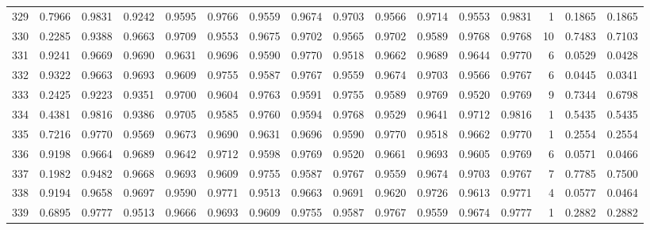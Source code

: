 \begin{tabular}{lrrrrrrrrrrrrrrr}
329 &      0.7966 &  0.9831 &  0.9242 &  0.9595 &  0.9766 &  0.9559 &  0.9674 &  0.9703 &  0.9566 &  0.9714 &   0.9553 &     0.9831 &      1 &                    0.1865 &                     0.1865 \\
330 &      0.2285 &  0.9388 &  0.9663 &  0.9709 &  0.9553 &  0.9675 &  0.9702 &  0.9565 &  0.9702 &  0.9589 &   0.9768 &     0.9768 &     10 &                    0.7483 &                     0.7103 \\
331 &      0.9241 &  0.9669 &  0.9690 &  0.9631 &  0.9696 &  0.9590 &  0.9770 &  0.9518 &  0.9662 &  0.9689 &   0.9644 &     0.9770 &      6 &                    0.0529 &                     0.0428 \\
332 &      0.9322 &  0.9663 &  0.9693 &  0.9609 &  0.9755 &  0.9587 &  0.9767 &  0.9559 &  0.9674 &  0.9703 &   0.9566 &     0.9767 &      6 &                    0.0445 &                     0.0341 \\
333 &      0.2425 &  0.9223 &  0.9351 &  0.9700 &  0.9604 &  0.9763 &  0.9591 &  0.9755 &  0.9589 &  0.9769 &   0.9520 &     0.9769 &      9 &                    0.7344 &                     0.6798 \\
334 &      0.4381 &  0.9816 &  0.9386 &  0.9705 &  0.9585 &  0.9760 &  0.9594 &  0.9768 &  0.9529 &  0.9641 &   0.9712 &     0.9816 &      1 &                    0.5435 &                     0.5435 \\
335 &      0.7216 &  0.9770 &  0.9569 &  0.9673 &  0.9690 &  0.9631 &  0.9696 &  0.9590 &  0.9770 &  0.9518 &   0.9662 &     0.9770 &      1 &                    0.2554 &                     0.2554 \\
336 &      0.9198 &  0.9664 &  0.9689 &  0.9642 &  0.9712 &  0.9598 &  0.9769 &  0.9520 &  0.9661 &  0.9693 &   0.9605 &     0.9769 &      6 &                    0.0571 &                     0.0466 \\
337 &      0.1982 &  0.9482 &  0.9668 &  0.9693 &  0.9609 &  0.9755 &  0.9587 &  0.9767 &  0.9559 &  0.9674 &   0.9703 &     0.9767 &      7 &                    0.7785 &                     0.7500 \\
338 &      0.9194 &  0.9658 &  0.9697 &  0.9590 &  0.9771 &  0.9513 &  0.9663 &  0.9691 &  0.9620 &  0.9726 &   0.9613 &     0.9771 &      4 &                    0.0577 &                     0.0464 \\
339 &      0.6895 &  0.9777 &  0.9513 &  0.9666 &  0.9693 &  0.9609 &  0.9755 &  0.9587 &  0.9767 &  0.9559 &   0.9674 &     0.9777 &      1 &                    0.2882 &                     0.2882 \\

\end{tabular}
